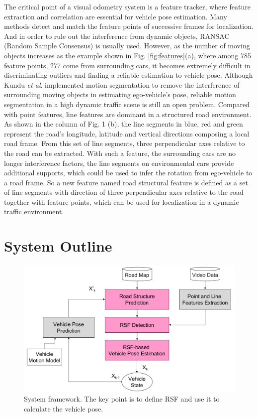 \documentclass[letterpaper, 10 pt, conference]{ieeeconf}  %
\begin{document}
The critical point of a visual odometry system is a feature tracker, where feature extraction and correlation are essential for vehicle pose estimation. Many methods detect and match the feature points of successive frames for localization. And in order to rule out the interference from dynamic objects, RANSAC (Random Sample Consensus) \cite{fischler1981random} is usually used. However, as the number of moving objects increases as the example shown in Fig. \ref{fig:features}(a), where among 785 feature points, 277 come from surrounding cars, it becomes extremely difficult in discriminating outliers and finding a reliable estimation to vehicle pose. Although Kundu \emph{et al}.\cite{kundu2011realtime}  implemented motion segmentation to remove the interference of surrounding moving objects in estimating ego-vehicle's pose, reliable motion segmentation in a high dynamic traffic scene is still an open problem.
Compared with point features, line features are dominant in a structured road environment. As shown in the column of Fig. 1 (b), the line segments in blue, red and green represent the road's longitude, latitude and vertical directions composing a local road frame.
From this set of line segments, three perpendicular axes relative to the road can be extracted. With such a feature, the surrounding cars are no longer interference factors, the line segments on environmental cars provide additional supports, which could be used to infer the rotation from ego-vehicle to a road frame.
So a new feature named road structural feature is defined as a set of line segments with direction of three perpendicular axes relative to the road together with feature points, which can be used for localization in a dynamic traffic environment.

\section{System Outline}
\label{sec_overview}
\begin{figure}
\centering
\includegraphics[width=0.9\linewidth]{source//Final//framework.pdf}
\caption{System framework. The key point is to define RSF and use it to calculate the vehicle pose.}
\label{fig:framework}
\end{figure}
\end{document}
